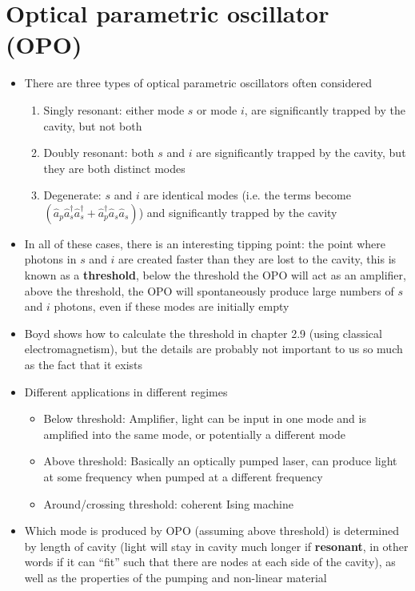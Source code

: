 \documentclass[english]{article}
\begin{document}
\section{Optical parametric oscillator (OPO)}
\begin{itemize}
\item There are three types of optical parametric oscillators often considered
\begin{enumerate}
\item Singly resonant:  either mode $s$ or mode $i$, are significantly trapped by the cavity, but not both
\item Doubly resonant: both $s$ and $i$ are significantly trapped by the cavity, but they are both distinct modes
\item Degenerate: $s$ and $i$ are identical modes (i.e. the terms become $\left(\hat{a}_p\hat{a}^\dagger_s\hat{a}^\dagger_s+\hat{a}^\dagger_p\hat{a}_s\hat{a}_s\right)$) and significantly trapped by the cavity
\end{enumerate}
\item In all of these cases, there is an interesting tipping point: the point where photons in $s$ and $i$ are created faster than they are lost to the cavity, this is known as a \textbf{threshold}, below the threshold the OPO will act as an amplifier, above the threshold, the OPO will spontaneously produce large numbers of $s$ and $i$ photons, even if these modes are initially empty
\item Boyd shows how to calculate the threshold in chapter 2.9 (using classical electromagnetism), but the details are probably not important to us so much as the fact that it exists
\item Different applications in different regimes
\begin{itemize}
\item Below threshold: Amplifier, light can be input in one mode and is amplified into the same mode, or potentially a different mode
\item Above threshold: Basically an optically pumped laser, can produce light at some frequency when pumped at a different frequency
\item Around/crossing threshold: coherent Ising machine
\end{itemize}
\item Which mode is produced by OPO (assuming above threshold) is determined by length of cavity (light will stay in cavity much longer if \textbf{resonant}, in other words if it can ``fit'' such that there are nodes at each side of the cavity), as well as the properties of the pumping and non-linear material

\end{itemize}
\end{document}
